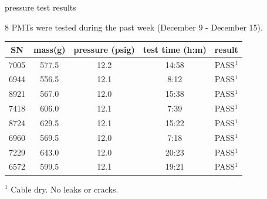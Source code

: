 \documentclass{beamer}
\begin{document}
\begin{frame}{pressure test results}
	\begin{center}
		\small
		8 PMTs were tested during the past week (December 9 - December 15).
\begin{table}
\begin{tabular}{c|c|c|c|c}
	SN & mass(g) & pressure (psig) & test time (h:m) & result \\
	\hline
	7005 & 577.5 & 12.2 & 14:58 & PASS$^1$ \\
	6944 & 556.5 & 12.1 & 8:12 & PASS$^1$ \\
	8921 & 567.0 & 12.0 & 15:38 & PASS$^1$ \\
	7418 & 606.0 & 12.1 & 7:39 & PASS$^1$ \\
	8724 & 629.5 & 12.1 & 15:22 & PASS$^1$ \\
	6960 & 569.5 & 12.0 & 7:18 & PASS$^1$ \\
	7229	& 643.0 & 12.0 & 20:23 & PASS$^1$ \\
	6572& 599.5 & 12.1 & 19:21 & PASS$^1$ \\
\end{tabular}
\begin{flushleft}
\scriptsize
	$^1$ Cable dry. No leaks or cracks.\\
\end{flushleft}
\end{table}
\end{center}
\end{frame}
\end{document}
